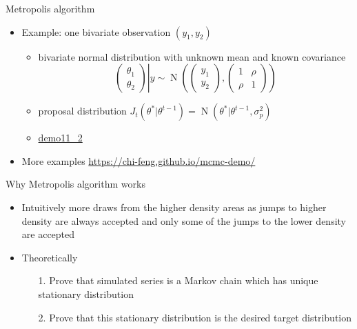 \documentclass[finnish,english,t]{beamer}
\DeclareMathOperator{\N}{N}
\begin{document}
\begin{frame}{Metropolis algorithm}

  \begin{itemize}
  \item Example: one bivariate observation $(y_1,y_2)$
    \begin{itemize}
    \item bivariate normal distribution with unknown mean and known
      covariance
       \begin{equation*}
         \left.
         \begin{pmatrix}
           \theta_1\\
           \theta_2
         \end{pmatrix}
         \right| y \sim
         \N\left(
           \begin{pmatrix}
             y_1\\
             y_2
           \end{pmatrix},
           \begin{pmatrix}
             1 & \rho\\
             \rho & 1
         \end{pmatrix}
       \right)
       \end{equation*}
     \item proposal distribution
       $J_t(\theta^{*}|\theta^{t-1})=\N(\theta^{*}|\theta^{t-1},\sigma_p^2)$
     \item \href{https://avehtari.github.io/BDA_R_demos/demos_ch11/demo11_2.html}{demo11\_2}
     \end{itemize}
   \item<2-> More examples {\small \url{https://chi-feng.github.io/mcmc-demo/}}
   \end{itemize}

\end{frame}

 \begin{frame}{Why Metropolis algorithm works}

  \begin{itemize}
  \item Intuitively more draws from the higher density areas as
    jumps to higher density are always accepted and only some of the
    jumps to the lower density are accepted
    \vspace{5mm}
    \pause
  \item Theoretically
    \begin{itemize}
    \item[1.] Prove that simulated series is a Markov chain
      which has unique stationary distribution
    \item[2.] Prove that this stationary distribution is the desired target distribution
    \end{itemize}
\end{itemize}

\end{frame}
\end{document}
